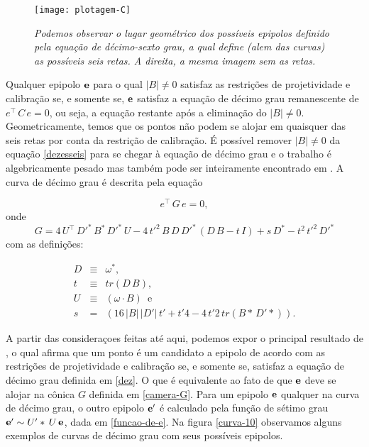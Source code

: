 \begin{figure}[!htb]
\centering
\texttt{[image: plotagem-C]}
\caption{\textit{Podemos observar o lugar geométrico dos possíveis epipolos definido pela equação de décimo-sexto grau, a qual define (alem das curvas) as possíveis seis retas. A direita, a mesma imagem sem as retas.}}
\label{plot-C}
\end{figure}

Qualquer epipolo ${\bf e}$ para o qual $|B|\ne0$ satisfaz as restrições de projetividade e calibração se, e somente se, ${\bf e}$ satisfaz a equação de décimo grau remanescente de $e^\top\,C\,e=0$, ou seja, a equação restante após a eliminação do $|B|\ne0$. Geometricamente, temos que os pontos não podem se alojar em quaisquer das seis retas por conta da restrição de calibração. É possível remover $|B|\ne0$ da equação \ref{dezesseis} para se chegar à equação de décimo grau e o trabalho é algebricamente pesado mas também pode ser inteiramente encontrado em \cite{kneebone}. A curva de décimo grau é descrita pela equação

\begin{equation}
e^\top\,G\,e=0,
\label{dez}
\end{equation}
onde 
\begin{equation}
G=4\,U^\top\,D'^*\,B^*\,D'^*\,U-4\,t'^2\,B\,D\,D'^*\,(D\,B-t\,I)+s\,D^*-t^2\,t'^2\,D'^*
\label{conica-G}
\end{equation}
com as definições:

\begin{equation}
\begin{array}{rcl}
D&\equiv&\omega^*,\\
t&\equiv&tr(D\,B),\\
U&\equiv&(\omega \cdot B)\,\,\, \text{e}\\
s&=&(16\,|B|\,|D'|\,t'+t'4-4\,t'2\,tr(B*\,D'*)).
\end{array}
\end{equation}

A partir das consideraçoes feitas até aqui, podemos expor o principal resultado de \cite{kneebone}, o qual afirma que um ponto é um candidato a epipolo de acordo com as restrições de projetividade e calibração se, e somente se, satisfaz a equação de décimo grau definida em \ref{dez}. O que é equivalente ao fato de que ${\bf e}$ deve se alojar na cônica $G$ definida em \ref{camera-G}. Para um epipolo ${\bf e}$ qualquer na curva de décimo grau, o outro epipolo ${\bf e'}$ é calculado pela função de sétimo grau ${\bf e'} \sim U'*\,U\,{\bf e}$, dada em \ref{funcao-de-e}. Na figura \ref{curva-10} observamos alguns exemplos de curvas de décimo grau com seus possíveis epipolos. 


